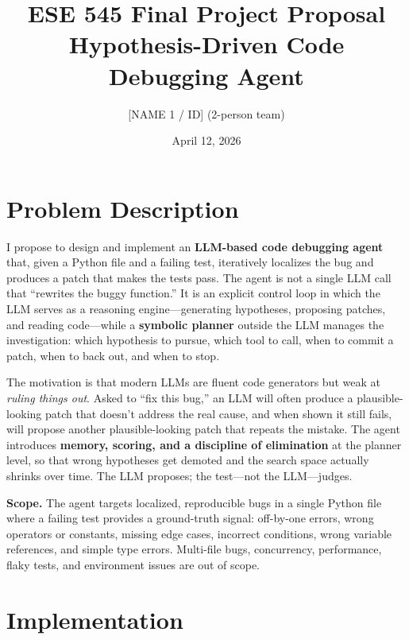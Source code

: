 \documentclass[11pt]{article}
\title{\vspace{-2em}\textbf{ESE 545 Final Project Proposal}\\[0.2em]
       \large Hypothesis-Driven Code Debugging Agent}
\author{[NAME 1 / ID] \quad [NAME 2 / ID] \quad (2-person team)}
\date{April 12, 2026}
\begin{document}
\maketitle
\vspace{-2em}

\section{Problem Description}

I propose to design and implement an \textbf{LLM-based code debugging agent} that, given a Python file and a failing test, iteratively localizes the bug and produces a patch that makes the tests pass. The agent is not a single LLM call that ``rewrites the buggy function.'' It is an explicit control loop in which the LLM serves as a reasoning engine---generating hypotheses, proposing patches, and reading code---while a \textbf{symbolic planner} outside the LLM manages the investigation: which hypothesis to pursue, which tool to call, when to commit a patch, when to back out, and when to stop.

The motivation is that modern LLMs are fluent code generators but weak at \emph{ruling things out}. Asked to ``fix this bug,'' an LLM will often produce a plausible-looking patch that doesn't address the real cause, and when shown it still fails, will propose another plausible-looking patch that repeats the mistake. The agent introduces \textbf{memory, scoring, and a discipline of elimination} at the planner level, so that wrong hypotheses get demoted and the search space actually shrinks over time. The LLM proposes; the test---not the LLM---judges.

\textbf{Scope.} The agent targets localized, reproducible bugs in a single Python file where a failing test provides a ground-truth signal: off-by-one errors, wrong operators or constants, missing edge cases, incorrect conditions, wrong variable references, and simple type errors. Multi-file bugs, concurrency, performance, flaky tests, and environment issues are out of scope.

\section{Implementation}
\end{document}

